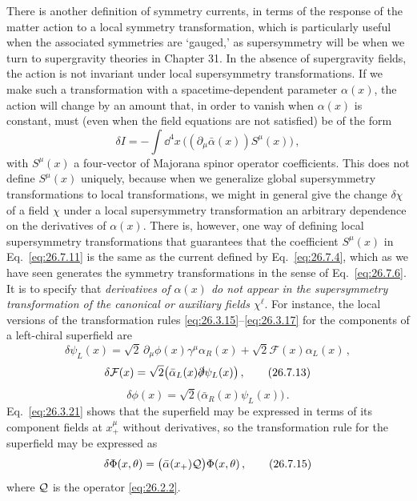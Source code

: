 There is another definition of symmetry currents, in terms of the response
of the matter action to a local symmetry transformation, which is
particularly useful when the associated symmetries are `gauged,' as
supersymmetry will be when we turn to supergravity theories in Chapter 31.
In the absence of supergravity fields, the action is not invariant under
local supersymmetry transformations. If we make such a transformation with a
spacetime-dependent parameter \(\alpha(x)\), the action will change by an
amount that, in order to vanish when \(\alpha(x)\) is constant, must (even
when the field equations are not satisfied) be of the form
\begin{equation}
  \delta I
  =-\int \dd^4x\,\bigl((\partial_\mu\bar\alpha(x))S^\mu(x)\bigr)\,,
  \tag{26.7.11}\label{eq:26.7.11}
\end{equation}
with \(S^\mu(x)\) a four-vector of Majorana spinor operator coefficients.
This does not define \(S^\mu(x)\) uniquely, because when we generalize global
supersymmetry transformations to local transformations, we might in general
give the change \(\delta\chi\) of a field \(\chi\) under a local
supersymmetry transformation an arbitrary dependence on the derivatives of
\(\alpha(x)\). There is, however, one way of defining local supersymmetry
transformations that guarantees that the coefficient \(S^\mu(x)\) in
Eq.~\eqref{eq:26.7.11} is the same as the current defined by
Eq.~\eqref{eq:26.7.4}, which as we have seen generates the symmetry
transformations in the sense of Eq.~\eqref{eq:26.7.6}. It is to specify that
\emph{derivatives of \(\alpha(x)\) do not appear in the supersymmetry
transformation of the canonical or auxiliary fields \(\chi^\ell\)}. For
instance, the local versions of the transformation rules
\eqref{eq:26.3.15}--\eqref{eq:26.3.17} for the components of a left-chiral
superfield are
\begin{equation}
  \delta\psi_L(x)
  =\sqrt{2}\,\partial_\mu\phi(x)\gamma^\mu\alpha_R(x)
   +\sqrt{2}\mathcal{F}(x)\alpha_L(x)\,,
  \tag{26.7.12}\label{eq:26.7.12}
\end{equation}
\begin{equation}
  \delta\mathcal{F}(x)
  =\sqrt{2}\bigl(\bar\alpha_L(x)\sl{\partial}\psi_L(x)\bigr)\,,
  \tag{26.7.13}\label{eq:26.7.13}
\end{equation}
\begin{equation}
  \delta\phi(x)
  =\sqrt{2}\bigl(\bar\alpha_R(x)\psi_L(x)\bigr)\,.
  \tag{26.7.14}\label{eq:26.7.14}
\end{equation}
Eq.~\eqref{eq:26.3.21} shows that the superfield may be expressed in terms of
its component fields at \(x_+^\mu\) without derivatives, so the
transformation rule for the superfield may be expressed as
\begin{equation}
  \delta\Phi(x,\theta)
  =\bigl(\bar\alpha(x_+)\SuperQ\bigr)\Phi(x,\theta)\,,
  \tag{26.7.15}\label{eq:26.7.15}
\end{equation}
where \(\SuperQ\) is the operator \eqref{eq:26.2.2}.

